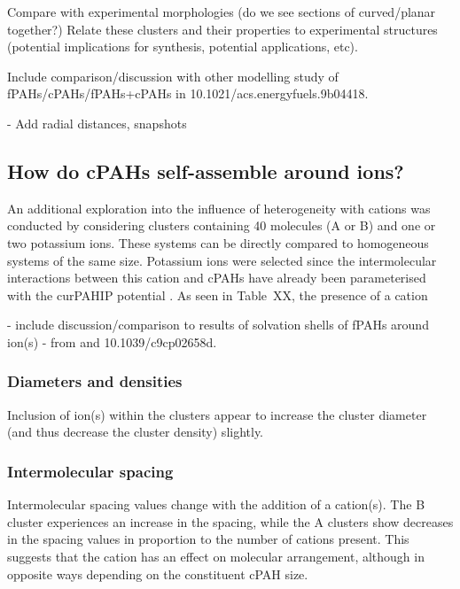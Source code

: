 Compare with experimental morphologies (do we see sections of curved/planar together?)
Relate these clusters and their properties to experimental structures (potential implications for synthesis, potential applications, etc).

Include comparison/discussion with other modelling study of fPAHs/cPAHs/fPAHs+cPAHs in 10.1021/acs.energyfuels.9b04418.

- Add radial distances, snapshots


\subsection{How do cPAHs self-assemble around ions?}

An additional exploration into the influence of heterogeneity with cations was conducted by considering clusters containing 40 molecules (A or B) and one or two potassium ions.  These systems can be directly compared to homogeneous systems of the same size.  Potassium ions were selected since the intermolecular interactions between this cation and cPAHs have already been parameterised with the curPAHIP potential \cite{bowal2019ion}. As seen in Table~XX, the presence of a cation

- include discussion/comparison to results of solvation shells of fPAHs around ion(s) - from \cite{bowal2019ion} and 10.1039/c9cp02658d.

\subsubsection{Diameters and densities}
Inclusion of ion(s) within the clusters appear to increase the cluster diameter (and thus decrease the cluster density) slightly.

\subsubsection{Intermolecular spacing}
Intermolecular spacing values change with the addition of a cation(s). The B cluster experiences an increase in the spacing, while the A clusters show decreases in the spacing values in proportion to the number of cations present. This suggests that the cation has an effect on molecular arrangement, although in opposite ways depending on the constituent cPAH size.

